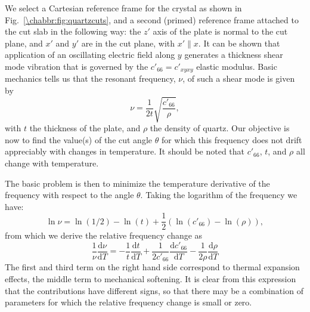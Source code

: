 We select a Cartesian reference frame for the crystal as shown in Fig.~\ref{\chabbr:fig:quartzcuts}, and a second (primed) reference frame attached to the cut slab in the following way: the $z'$ axis of the plate is normal to the cut plane, and $x'$ and $y'$ are in the cut plane, with $x'\parallel x$.  It can be shown that application of an oscillating electric field along $y$ generates a thickness shear mode vibration that is governed by the $c'_{66}=c'_{xyxy}$ elastic modulus. Basic mechanics tells us that the resonant frequency, $\nu$, of such a shear mode is given by
\begin{equation}
	\nu = \frac{1}{2t}\sqrt{\frac{c'_{66}}{\rho}},
\end{equation}
with $t$ the thickness of the plate, and $\rho$ the density of quartz.  Our objective is now to find the value(s) of the cut angle $\theta$ for which this frequency does not drift appreciably with changes in temperature.  It should be noted that $c'_{66}$, $t$, and $\rho$ all change with temperature.

The basic problem is then to minimize the temperature derivative of the frequency with respect to the angle $\theta$. Taking the logarithm of the frequency we have:
\[
	\ln \nu = \ln(1/2)-\ln(t)+\frac{1}{2}(\ln(c'_{66})-\ln(\rho)),
\]
from which we derive the relative frequency change as
\[
	\frac{1}{\nu}\frac{\mathrm{d}\nu}{\mathrm{d}T} = -\frac{1}{t}\frac{\mathrm{d}t}{\mathrm{d}T}+\frac{1}{2c'_{66}}\frac{\mathrm{d}c'_{66}}{\mathrm{d}T}-\frac{1}{2\rho}\frac{\mathrm{d}\rho}{\mathrm{d}T}
\]
The first and third term on the right hand side correspond to thermal expansion effects, the middle term to mechanical softening.  It is clear from this expression that the contributions have different signs, so that there may be a combination of parameters for which the relative frequency change is small or zero.


